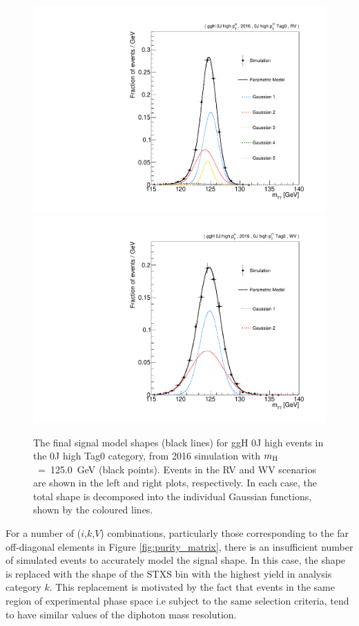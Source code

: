 \begin{figure}
  \centering
  \includegraphics[width=.49\textwidth]{Figures/hgg_stats/RV_shape_pdf_components_GG2H_0J_PTH_GT10_RECO_0J_PTH_GT10_Tag0.pdf}
  \hfill
  \includegraphics[width=.49\textwidth]{Figures/hgg_stats/WV_shape_pdf_components_GG2H_0J_PTH_GT10_RECO_0J_PTH_GT10_Tag0.pdf}
  \caption[Signal modelling: components]
  {
    The final signal model shapes (black lines) for ggH 0J high \ptH events in the 0J high \ptgg Tag0 category, from 2016 simulation with $m_{\rm{H}}$~=~125.0~GeV (black points). Events in the RV and WV scenarios are shown in the left and right plots, respectively. In each case, the total shape is decomposed into the individual Gaussian functions, shown by the coloured lines.
  }
  \label{fig:signal_fitting}
\end{figure}

For a number of ($i$,$k$,$V$) combinations, particularly those corresponding to the far off-diagonal elements in Figure \ref{fig:purity_matrix}, there is an insufficient number of simulated events to accurately model the signal shape. In this case, the shape is replaced with the shape of the STXS bin with the highest yield in analysis category $k$. This replacement is motivated by the fact that events in the same region of experimental phase space i.e subject to the same selection criteria, tend to have similar values of the diphoton mass resolution.

